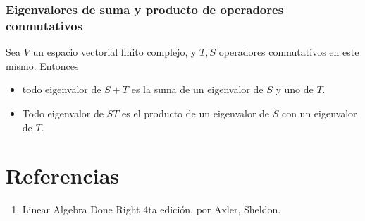 \documentclass{article}
\begin{document}
\subsubsection{Eigenvalores de suma y producto de operadores conmutativos}
Sea $V$ un espacio vectorial finito complejo, y $T, S$
operadores conmutativos en este mismo. Entonces
\begin{itemize}
    \item todo eigenvalor de $S+T$ es la suma de un eigenvalor de $S$ y uno de $T$.
    \item Todo eigenvalor de $ST$ es el producto de un eigenvalor de $S$ con un eigenvalor de $T$.
\end{itemize}

\newpage
\section*{Referencias}
\begin{enumerate}
    \item Linear Algebra Done Right 4ta edición, por Axler, Sheldon.
\end{enumerate}
\end{document}
